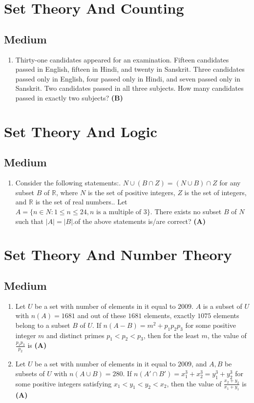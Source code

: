 \documentclass{article}
\begin{document}
\section{Set Theory And Counting}
\subsection{Medium}
\begin{enumerate}
\item Thirty-one candidates appeared for an examination. Fifteen candidates passed in English, fifteen in Hindi, and twenty in Sanskrit. Three candidates passed only in English, four passed only in Hindi, and seven passed only in Sanskrit. Two candidates passed in all three subjects. How many candidates passed in exactly two subjects? \hfill \textbf{(B)}
\end{enumerate}
\section{Set Theory And Logic}
\subsection{Medium}
\begin{enumerate}
\item Consider the following statements:. $N \cup (B \cap Z) = (N \cup B) \cap Z$ for any subset $B$ of $\mathbb{R}$, where $N$ is the set of positive integers, $Z$ is the set of integers, and $\mathbb{R}$ is the set of real numbers.. Let $A = \{n \in N : 1 \leq n \leq 24, n \text{ is a multiple of } 3\}$. There exists no subset $B$ of $N$ such that $|A| = |B|$.\nWhich of the above statements is/are correct? \hfill \textbf{(A)}
\end{enumerate}
\section{Set Theory And Number Theory}
\subsection{Medium}
\begin{enumerate}
\item Let $U$ be a set with number of elements in it equal to $2009$. $A$ is a subset of $U$ with $n(A) = 1681$ and out of these $1681$ elements, exactly $1075$ elements belong to a subset $B$ of $U$. If $n(A - B) = m^2 + p_1p_2p_3$ for some positive integer $m$ and distinct primes $p_1 < p_2 < p_3$, then for the least $m$, the value of $\frac{p_1p_3}{p_2}$ is \hfill \textbf{(A)}
\item Let $U$ be a set with number of elements in it equal to $2009$, and $A, B$ be subsets of $U$ with $n(A \cup B) = 280$. If $n(A' \cap B') = x_1^3 + x_2^3 = y_1^3 + y_2^3$ for some positive integers satisfying $x_1 < y_1 < y_2 < x_2$, then the value of $\frac{x_2 + y_2}{x_1 + y_1}$ is \hfill \textbf{(A)}
\end{enumerate}
\end{document}
